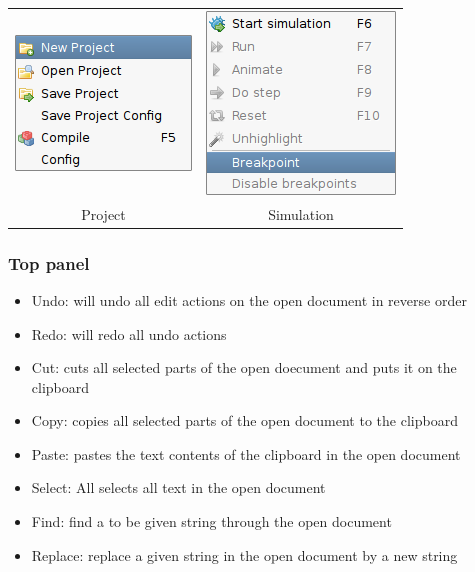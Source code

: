     \begin{table}[h!]
        \begin{tabular}{cc}
            \includegraphics[width=.25\textwidth]{img/NewImg/project_tab.png}
                &
            \includegraphics[width=.25\textwidth]{img/NewImg/simulation.png}
                \\
            Project & Simulation
        \end{tabular}
    \end{table}
 
    \subsubsection{Top panel}
        \begin{itemize}
            \item Undo: will undo all edit actions on the open document in reverse order
            \item Redo: will redo all undo actions
            \item Cut: cuts all selected parts of the open doecument and puts it on the clipboard
            \item Copy: copies all selected parts of the open document to the clipboard
            \item Paste: pastes the text contents of the clipboard in the open document
            \item Select: All selects all text in the open document
            \item Find: find a to be given string through the open document
            \item Replace: replace a given string in the open document by a new string
        \end{itemize}
    
